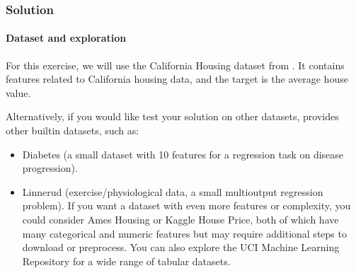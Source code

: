 \documentclass[letterpaper,10pt,english]{jupyterBook}
\begin{document}
\subsubsection{Solution}
\label{\detokenize{03:solution}}

\paragraph{Dataset and exploration}
\label{\detokenize{03:dataset-and-exploration}}
\sphinxAtStartPar
For this exercise, we will use the California Housing dataset from . It contains features related to California housing data, and the target is the average house value.

\sphinxAtStartPar
Alternatively, if you would like test your solution on other datasets,  provides other built\sphinxhyphen{}in datasets, such as:
\begin{itemize}
\item {} 
\sphinxAtStartPar
Diabetes (a small dataset with 10 features for a regression task on disease progression).

\item {} 
\sphinxAtStartPar
Linnerud (exercise/physiological data, a small multi\sphinxhyphen{}output regression problem).
If you want a dataset with even more features or complexity, you could consider Ames Housing or Kaggle House Price, both of which have many categorical and numeric features but may require additional steps to download or preprocess. You can also explore the UCI Machine Learning Repository for a wide range of tabular datasets.

\end{itemize}
\end{document}
